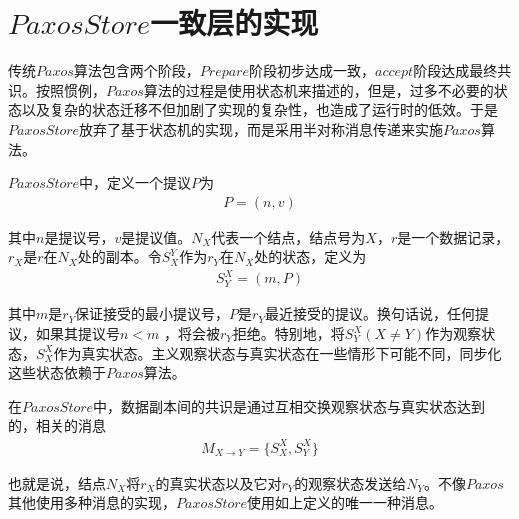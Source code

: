 \section{$PaxosStore$一致层的实现}
	\par 传统$Paxos$算法包含两个阶段，$Prepare$阶段初步达成一致，$accept$阶段达成最终共识。按照惯例，$Paxos$算法的过程是使用状态机来描述的，但是，过多不必要的状态以及复杂的状态迁移不但加剧了实现的复杂性，也造成了运行时的低效。于是$PaxosStore$放弃了基于状态机的实现，而是采用半对称消息传递来实施$Paxos$算法。
	\par $PaxosStore$中，定义一个提议$P$为
\begin{align*}
P=(n,v) 
\end{align*}
	\par 其中$n$是提议号，$v$是提议值。$N_X$代表一个结点，结点号为$X$，$r$是一个数据记录，$r_X$是$r$在$N_X$处的副本。令$S_X^Y$作为$r_Y$在$N_X$处的状态，定义为
\begin{align*}
S_Y^X=(m,P)
\end{align*}
	\par 其中$m$是$r_Y$保证接受的最小提议号，$P$是$r_Y$最近接受的提议。换句话说，任何提议，如果其提议号$n<m$	，将会被$r_Y$拒绝。特别地，将$S_Y^X(X\neq Y)$作为观察状态，$S_X^X$作为真实状态。主义观察状态与真实状态在一些情形下可能不同，同步化这些状态依赖于$Paxos$算法。
	\par 在$PaxosStore$中，数据副本间的共识是通过互相交换观察状态与真实状态达到的，相关的消息
\begin{align*}
M_{X\rightarrow Y}=\{S_X^X, S_Y^X\}
\end{align*}
	\par 也就是说，结点$N_X$将$r_X$的真实状态以及它对$r_Y$的观察状态发送给$N_Y$。不像$Paxos$其他使用多种消息的实现，$PaxosStore$使用如上定义的唯一一种消息。

